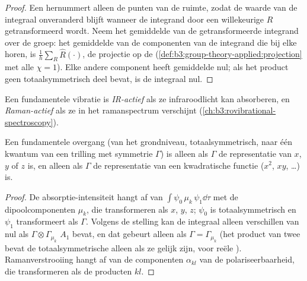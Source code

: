 \begin{proof}
Een  hernummert alleen de punten van de ruimte, zodat de
waarde van de integraal onveranderd blijft wanneer de integrand door een
willekeurige $R$ getransformeerd wordt. Neem het gemiddelde van de
getransformeerde integrand over de groep: het gemiddelde van de componenten van
de integrand die bij elke  horen, is
$\frac1h\sum_R\hat R(\cdot)$, de projectie op de  (\cref{def:b3:group-theory-applied:projection} met alle
$\chi = 1$). Elke andere component heeft gemiddelde nul; als het product
geen totaalsymmetrisch deel bevat, is de integraal nul.
\end{proof}

\begin{definition}\label{def:b3:group-theory-applied:activity}
Een fundamentele vibratie is \emph{IR-actief} als ze
infraroodlicht kan absorberen, en \emph{Raman-actief}
als ze in het
ramanspectrum verschijnt (\cref{ch:b3:rovibrational-spectroscopy}).
\end{definition}

\begin{corollary}\label{cor:b3:group-theory-applied:ir-raman}
Een fundamentele overgang (van het grondniveau, totaalsymmetrisch, naar
één kwantum van een trilling met symmetrie $\Gamma$) is alleen 
als $\Gamma$ de
representatie van $x$, $y$ of $z$ is, en alleen  als $\Gamma$ de
representatie van een kwadratische functie ($x^2$, $xy$, \dots) is.
\end{corollary}

\begin{proof}
De absorptie-intensiteit hangt af van $\int\psi_0\,\mu_k\,\psi_1\dd\tau$ met de
dipoolcomponenten $\mu_k$, die transformeren als $x$, $y$, $z$; $\psi_0$ is
totaalsymmetrisch en $\psi_1$ transformeert als $\Gamma$. Volgens de
stelling kan de integraal alleen verschillen van nul
als $\Gamma\otimes\Gamma_{\mu_k}$ $A_1$ bevat, en dat gebeurt alleen als $\Gamma =
\Gamma_{\mu_k}$ (het product van twee  bevat de
totaalsymmetrische alleen als ze gelijk zijn, voor reële ).
Ramanverstrooiing hangt af van de componenten $\alpha_{kl}$ van de
polariseerbaarheid, die
transformeren als de producten $kl$.
\end{proof}

